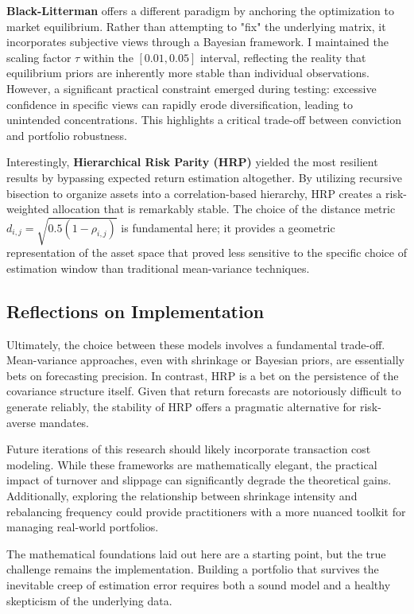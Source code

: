 \documentclass[11pt,a4paper]{article}
\begin{document}
\textbf{Black-Litterman} offers a different paradigm by anchoring the optimization to market equilibrium. Rather than attempting to "fix" the underlying matrix, it incorporates subjective views through a Bayesian framework. I maintained the scaling factor $\tau$ within the $[0.01, 0.05]$ interval, reflecting the reality that equilibrium priors are inherently more stable than individual observations. However, a significant practical constraint emerged during testing: excessive confidence in specific views can rapidly erode diversification, leading to unintended concentrations. This highlights a critical trade-off between conviction and portfolio robustness.

Interestingly, \textbf{Hierarchical Risk Parity (HRP)} yielded the most resilient results by bypassing expected return estimation altogether. By utilizing recursive bisection to organize assets into a correlation-based hierarchy, HRP creates a risk-weighted allocation that is remarkably stable. The choice of the distance metric $d_{i,j} = \sqrt{0.5(1-\rho_{i,j})}$ is fundamental here; it provides a geometric representation of the asset space that proved less sensitive to the specific choice of estimation window than traditional mean-variance techniques.

\subsection*{Reflections on Implementation}

Ultimately, the choice between these models involves a fundamental trade-off. Mean-variance approaches, even with shrinkage or Bayesian priors, are essentially bets on forecasting precision. In contrast, HRP is a bet on the persistence of the covariance structure itself. Given that return forecasts are notoriously difficult to generate reliably, the stability of HRP offers a pragmatic alternative for risk-averse mandates.

Future iterations of this research should likely incorporate transaction cost modeling. While these frameworks are mathematically elegant, the practical impact of turnover and slippage can significantly degrade the theoretical gains. Additionally, exploring the relationship between shrinkage intensity and rebalancing frequency could provide practitioners with a more nuanced toolkit for managing real-world portfolios.

The mathematical foundations laid out here are a starting point, but the true challenge remains the implementation. Building a portfolio that survives the inevitable creep of estimation error requires both a sound model and a healthy skepticism of the underlying data.
\end{document}
